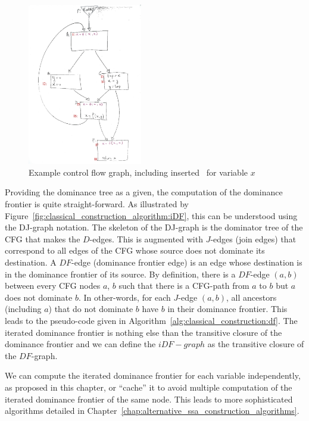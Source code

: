 \begin{figure}
\includegraphics[width=5cm]{ssa_variablex_label.pdf}
\caption{\label{fig:classical_construction_algorithm:examplecfg_varx}Example control flow graph, including
inserted \phiops\ for variable $x$
}
\end{figure}

Providing the dominance tree as a given, the computation of the dominance frontier is quite straight-forward. As illustrated by Figure~\ref{fig:classical_construction_algorithm:iDF}, this can be understood using the DJ-graph notation. The skeleton of the DJ-graph is the dominator tree of the CFG that makes the $D$-edges. This is augmented with $J$-edges (join edges) that correspond to all edges of the CFG whose source does not dominate its destination. A $DF$-edge (dominance frontier edge) is an edge whose destination is in the dominance frontier of its source. By definition, there is a $DF$-edge $(a,b)$ between every CFG nodes $a$, $b$ such that there is a CFG-path from $a$ to $b$ but $a$ does not dominate $b$. 
In other-words, for each  $J$-edge $(a,b)$, all ancestors (including $a$) that do not dominate $b$ have $b$ in their dominance frontier. This leads to the pseudo-code given in Algorithm~\ref{alg:classical_construction:df}. The iterated dominance frontier is nothing else than the transitive closure of the dominance frontier and we can define the $iDF-graph$ as the transitive closure of the $DF$-graph. 

We can compute the iterated dominance frontier for each variable independently, as proposed in this chapter, or ``cache'' it to avoid multiple computation of the iterated dominance frontier of the same node. This leads to more sophisticated algorithms detailed in Chapter~\ref{chap:alternative_ssa_construction_algorithms}.

